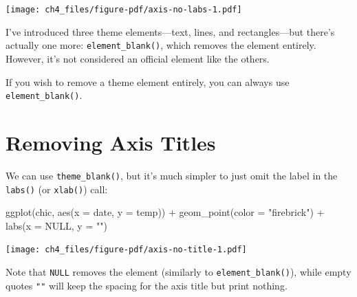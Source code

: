 \documentclass[
  letterpaper,
]{scrbook}
\newenvironment{Shaded}{\begin{snugshade}}{\end{snugshade}}
\newcommand{\AttributeTok}[1]{\textcolor[rgb]{0.40,0.45,0.13}{#1}}
\newcommand{\ConstantTok}[1]{\textcolor[rgb]{0.56,0.35,0.01}{#1}}
\newcommand{\FunctionTok}[1]{\textcolor[rgb]{0.28,0.35,0.67}{#1}}
\newcommand{\NormalTok}[1]{\textcolor[rgb]{0.00,0.23,0.31}{#1}}
\newcommand{\SpecialCharTok}[1]{\textcolor[rgb]{0.37,0.37,0.37}{#1}}
\newcommand{\StringTok}[1]{\textcolor[rgb]{0.13,0.47,0.30}{#1}}
\begin{document}
\texttt{[image: ch4\_files/figure-pdf/axis-no-labs-1.pdf]}

I've introduced three theme elements---text, lines, and rectangles---but
there's actually one more: \texttt{element\_blank()}, which removes the
element entirely. However, it's not considered an official element like
the others.

\begin{tcolorbox}[enhanced jigsaw, rightrule=.15mm, arc=.35mm, title=\textcolor{quarto-callout-tip-color}{\faLightbulb}\hspace{0.5em}{Removing Theme Element}, colback=white, toptitle=1mm, colbacktitle=quarto-callout-tip-color!10!white, breakable, left=2mm, opacityback=0, leftrule=.75mm, bottomrule=.15mm, bottomtitle=1mm, colframe=quarto-callout-tip-color-frame, coltitle=black, toprule=.15mm, opacitybacktitle=0.6, titlerule=0mm]

If you wish to remove a theme element entirely, you can always use
\texttt{element\_blank()}.

\end{tcolorbox}

\section{Removing Axis Titles}\label{removing-axis-titles}

We can use \texttt{theme\_blank()}, but it's much simpler to just omit
the label in the \texttt{labs()} (or \texttt{xlab()}) call:

\begin{Shaded}
\begin{Highlighting}[]
\FunctionTok{ggplot}\NormalTok{(chic, }\FunctionTok{aes}\NormalTok{(}\AttributeTok{x =}\NormalTok{ date, }\AttributeTok{y =}\NormalTok{ temp)) }\SpecialCharTok{+}
  \FunctionTok{geom\_point}\NormalTok{(}\AttributeTok{color =} \StringTok{"firebrick"}\NormalTok{) }\SpecialCharTok{+}
  \FunctionTok{labs}\NormalTok{(}\AttributeTok{x =} \ConstantTok{NULL}\NormalTok{, }\AttributeTok{y =} \StringTok{""}\NormalTok{)}
\end{Highlighting}
\end{Shaded}

\texttt{[image: ch4\_files/figure-pdf/axis-no-title-1.pdf]}

\begin{tcolorbox}[enhanced jigsaw, rightrule=.15mm, arc=.35mm, title=\textcolor{quarto-callout-tip-color}{\faLightbulb}\hspace{0.5em}{RAnother Tip!}, colback=white, toptitle=1mm, colbacktitle=quarto-callout-tip-color!10!white, breakable, left=2mm, opacityback=0, leftrule=.75mm, bottomrule=.15mm, bottomtitle=1mm, colframe=quarto-callout-tip-color-frame, coltitle=black, toprule=.15mm, opacitybacktitle=0.6, titlerule=0mm]

Note that \texttt{NULL} removes the element (similarly to
\texttt{element\_blank()}), while empty quotes \texttt{""} will keep the
spacing for the axis title but print nothing.

\end{tcolorbox}
\end{document}
